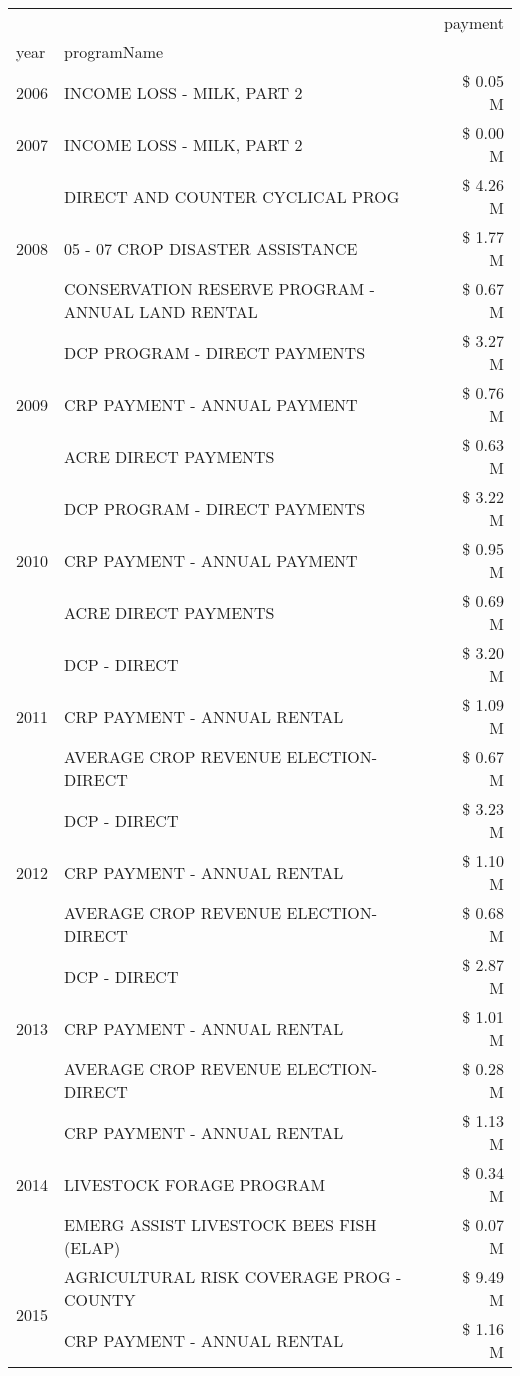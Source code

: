 \begin{tabular}{llr}
\toprule
 &  & payment \\
year & programName &  \\
\midrule
2006 & INCOME LOSS - MILK, PART 2 & \$ 0.05 M \\
\cline{1-3}
2007 & INCOME LOSS - MILK, PART 2 & \$ 0.00 M \\
\cline{1-3}
\multirow[t]{3}{*}{2008} & DIRECT AND COUNTER CYCLICAL PROG & \$ 4.26 M \\
 & 05 - 07 CROP DISASTER ASSISTANCE & \$ 1.77 M \\
 & CONSERVATION RESERVE PROGRAM - ANNUAL LAND RENTAL & \$ 0.67 M \\
\cline{1-3}
\multirow[t]{3}{*}{2009} & DCP PROGRAM - DIRECT PAYMENTS & \$ 3.27 M \\
 & CRP PAYMENT - ANNUAL PAYMENT & \$ 0.76 M \\
 & ACRE DIRECT PAYMENTS & \$ 0.63 M \\
\cline{1-3}
\multirow[t]{3}{*}{2010} & DCP PROGRAM - DIRECT PAYMENTS & \$ 3.22 M \\
 & CRP PAYMENT - ANNUAL PAYMENT & \$ 0.95 M \\
 & ACRE DIRECT PAYMENTS & \$ 0.69 M \\
\cline{1-3}
\multirow[t]{3}{*}{2011} & DCP - DIRECT & \$ 3.20 M \\
 & CRP PAYMENT - ANNUAL RENTAL & \$ 1.09 M \\
 & AVERAGE CROP REVENUE ELECTION-DIRECT & \$ 0.67 M \\
\cline{1-3}
\multirow[t]{3}{*}{2012} & DCP - DIRECT & \$ 3.23 M \\
 & CRP PAYMENT - ANNUAL RENTAL & \$ 1.10 M \\
 & AVERAGE CROP REVENUE ELECTION-DIRECT & \$ 0.68 M \\
\cline{1-3}
\multirow[t]{3}{*}{2013} & DCP - DIRECT & \$ 2.87 M \\
 & CRP PAYMENT - ANNUAL RENTAL & \$ 1.01 M \\
 & AVERAGE CROP REVENUE ELECTION-DIRECT & \$ 0.28 M \\
\cline{1-3}
\multirow[t]{3}{*}{2014} & CRP PAYMENT - ANNUAL RENTAL & \$ 1.13 M \\
 & LIVESTOCK FORAGE PROGRAM & \$ 0.34 M \\
 & EMERG ASSIST LIVESTOCK BEES FISH (ELAP) & \$ 0.07 M \\
\cline{1-3}
\multirow[t]{3}{*}{2015} & AGRICULTURAL RISK COVERAGE PROG - COUNTY & \$ 9.49 M \\
 & CRP PAYMENT - ANNUAL RENTAL & \$ 1.16 M \\

\end{tabular}
